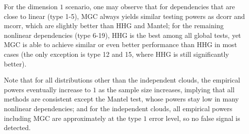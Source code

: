 \documentclass[11pt]{article}
\begin{document}
For the dimension $1$ scenario, one may observe that for dependencies that are close to linear (type 1-5), MGC always yields similar testing powers as dcorr and mcorr, which are slightly better than HHG and Mantel; for the remaining nonlinear dependencies (type 6-19), HHG is the best among all global tests, yet MGC is able to achieve similar or even better performance than HHG in most cases (the only exception is type 12 and 15, where HHG is still significantly better). 

Note that for all distributions other than the independent clouds, the empirical powers eventually increase to $1$ as the sample size increases, implying that all methods are consistent except the Mantel test, whose powers stay low in many nonlinear dependencies; and for the independent clouds, all empirical powers including MGC are approximately at the type $1$ error level, so no false signal is detected. 
\end{document}
